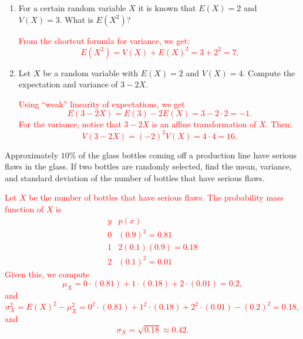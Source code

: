 \documentclass[12pt,reqno]{amsart}
\begin{document}
\begin{enumerate}
\item For a certain random variable $X$ it is known that $E(X)=2$ and $V(X) = 3$. What is $E(X^2)$?
    
\bigskip
\textcolor{red}{From the shortcut formula for variance, we get:
    	\[
	E(X^2) = V(X) + E(X)^2 = 3 + 2^2 = 7.
	\]}
\bigskip


\item Let $X$ be a random variable with $E(X)=2$ and $V(X)=4$. Compute the expectation and variance of $3-2X$.
    
\bigskip
\textcolor{red}{Using ``weak'' linearity of expectations, we get
    	\[
	E(3-2X) = E(3) -2 E(X) = 3 - 2\cdot 2 = -1.
	\]
    For the variance, notice that $3-2X$ is an affine transformation of $X$. Then:
    	\[
	V(3-2X) = (-2)^2 V(X) = 4\cdot 4 = 16.
	\]}
\end{enumerate}















\bigskip
\prob Approximately $10\%$ of the glass bottles coming off a production line have serious flaws in the glass. If two bottles are randomly selected, find the mean, variance, and standard deviation of the number of bottles that have serious flaws.

\bigskip
\textcolor{red}{Let $X$ be the number of bottles that have serious flaws. The probability mass function of $X$ is
	\[
	\begin{array}{c|c}
	y & p(x) \\ \hline
	0 & (0.9)^2 = 0.81   \\
	1 & 2(0.1)(0.9) = 0.18   \\
	2 & (0.1)^2 = 0.01
	\end{array}
	\]
Given this, we compute
	\[
	\mu_X = 0\cdot(0.81) + 1\cdot(0.18) + 2\cdot(0.01) = 0.2,
	\]
and
	\[
	\sigma^2_X = E(X)^2 - \mu^2_X = 0^2 \cdot(0.81)+ 1^2\cdot (0.18) + 2^2 \cdot(0.01) - (0.2)^2 = 0.18,
	\]
and
	\[
	\sigma_X = \sqrt{0.18} \approx 0.42.
	\]}
\bigskip
\end{document}

